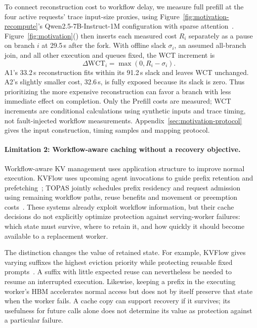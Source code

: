 To connect reconstruction cost to workflow delay, we measure full
prefill at the four active requests' trace input-size proxies, using
Figure~\ref{fig:motivation-recompute}'s Qwen2.5-7B-Instruct-1M
configuration with sparse attention~\cite{qwen2025qwen25oneM,jiang2024minference}.
Figure~\ref{fig:motivation}()
then inserts each measured cost $R_i$ separately as a pause on branch
$i$ at 29.5\,s after the fork. With offline slack $\sigma_i$, an assumed
all-branch join, and all other execution and queues fixed, the WCT
increment is
\[
  \Delta\mathrm{WCT}_i=\max(0,R_i-\sigma_i).
\]
A1's 33.2\,s reconstruction fits within its 91.2\,s slack and leaves WCT
unchanged. A2's slightly smaller cost, 32.6\,s, is fully exposed because
its slack is zero. Thus prioritizing the more expensive reconstruction
can favor a branch with less immediate effect on completion.
Only the Prefill costs are measured; WCT increments are conditional
calculations using synthetic inputs and trace timing, not fault-injected
workflow measurements. Appendix~\ref{sec:motivation-protocol} gives the
input construction, timing samples and mapping protocol.

\paragraph{Limitation 2: Workflow-aware caching without a recovery objective.}
Workflow-aware KV management uses application structure to improve
normal execution. KVFlow uses upcoming agent invocations to guide prefix
retention and prefetching~\cite{pan2025kvflow}; TOPAS jointly schedules
prefix residency and request admission using remaining workflow paths,
reuse benefits and movement or preemption costs~\cite{ni2026topas}.
These systems already exploit workflow information, but their cache
decisions do not explicitly optimize protection against serving-worker
failures: which state must survive, where to retain it, and how quickly
it should become available to a replacement worker.

The distinction changes the value of retained state. For example,
KVFlow gives varying suffixes the highest eviction priority while
protecting reusable fixed prompts~\cite{pan2025kvflow}. A suffix with
little expected reuse can nevertheless be needed to resume an
interrupted execution. Likewise, keeping a prefix in the executing
worker's HBM accelerates normal access but does not by itself preserve
that state when the worker fails. A cache copy can support recovery if
it survives; its usefulness for future calls alone does not determine
its value as protection against a particular failure.

